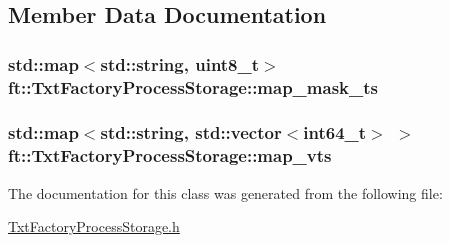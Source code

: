 \subsection{Member Data Documentation}
\subsubsection[{\texorpdfstring{map\+\_\+mask\+\_\+ts}{map_mask_ts}}]{\setlength{\rightskip}{0pt plus 5cm}std\+::map$<$std\+::string, uint8\+\_\+t$>$ ft\+::\+Txt\+Factory\+Process\+Storage\+::map\+\_\+mask\+\_\+ts\hspace{0.3cm}{\ttfamily [protected]}}\hypertarget{classft_1_1_txt_factory_process_storage_a343110030a220d5ab36663cbe5ed38f5}{}\label{classft_1_1_txt_factory_process_storage_a343110030a220d5ab36663cbe5ed38f5}
\subsubsection[{\texorpdfstring{map\+\_\+vts}{map_vts}}]{\setlength{\rightskip}{0pt plus 5cm}std\+::map$<$std\+::string, std\+::vector$<$int64\+\_\+t$>$ $>$ ft\+::\+Txt\+Factory\+Process\+Storage\+::map\+\_\+vts\hspace{0.3cm}{\ttfamily [protected]}}\hypertarget{classft_1_1_txt_factory_process_storage_a161c958fb54ded7f486fd20bd5348c42}{}\label{classft_1_1_txt_factory_process_storage_a161c958fb54ded7f486fd20bd5348c42}


The documentation for this class was generated from the following file\+:\begin{DoxyCompactItemize}
\item 
\hyperlink{_txt_factory_process_storage_8h}{Txt\+Factory\+Process\+Storage.\+h}\end{DoxyCompactItemize}
